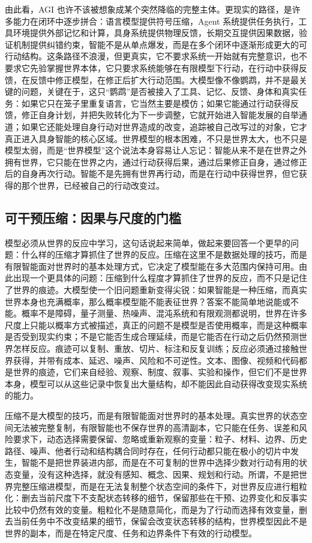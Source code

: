 由此看，AGI 也许不该被想象成某个突然降临的完整主体。更现实的路径，是许多能力在闭环中逐步拼合：语言模型提供符号压缩，Agent 系统提供任务执行，工具环境提供外部记忆和计算，具身系统提供物理反馈，长期交互提供因果数据，验证机制提供纠错约束，智能不是从单点爆发，而是在多个闭环中逐渐形成更大的可行动结构。这条路径不浪漫，但更真实，它不要求系统一开始就有完整意识，也不要求它先验掌握世界本体，它只要求系统能够在有限模型下行动，在行动中获得反馈，在反馈中修正模型，在修正后扩大行动范围。大模型像不像鹦鹉，并不是最关键的问题，关键在于，这只“鹦鹉”是否被接入了工具、记忆、反馈、身体和真实任务：如果它只在笼子里重复语言，它当然主要是模仿；如果它能通过行动获得反馈，修正自身计划，并把失败转化为下一步调整，它就开始进入智能发展的自举通道；如果它还能处理自身行动对世界造成的改变，追踪被自己改写过的对象，它才真正进入具身智能的核心区域。世界模型的根本困难，不只是世界太大，也不只是模型太弱，而是“世界模型”这个说法本身容易让人忘记：智能从来不是在世界之外拥有世界，它只能在世界之内，通过行动获得后果，通过后果修正自身，通过修正后的自身再次行动。智能不是先拥有世界再行动，而是在行动中获得世界，但它获得的那个世界，已经被自己的行动改变过。

\subsection{可干预压缩：因果与尺度的门槛}

模型必须从世界的反应中学习，这句话说起来简单，做起来要回答一个更早的问题：什么样的压缩才算抓住了世界的反应。压缩在这里不是数据处理的技巧，而是有限智能面对世界时的基本处理方式，它决定了模型能在多大范围内保持可用。由此出现一个更具体的问题：压缩到什么程度才算抓住了世界的反应，而不只是记住了世界的痕迹。大模型使一个旧问题重新变得尖锐：如果智能是一种压缩，而真实世界本身也充满概率，那么概率模型能不能表征世界？答案不能简单地说能或不能。概率不是障碍，量子测量、热噪声、混沌系统和有限观测都说明，世界在许多尺度上只能以概率方式被描述，真正的问题不是模型是否使用概率，而是这种概率是否受到现实约束；不是它能否生成合理延续，而是它能否在行动之后仍然预测世界怎样反应。痕迹可以复制、重放、切片、标注和反复训练；反应必须通过接触世界获得，并带有成本、延迟、噪声、风险和不可逆性。文本、图像、视频和代码都是世界的痕迹，它们来自经验、观察、制度、叙事、实验和操作，但它们不是世界本身，模型可以从这些记录中恢复出大量结构，却不能因此自动获得改变现实系统的能力。


压缩不是大模型的技巧，而是有限智能面对世界时的基本处理。真实世界的状态空间无法被完整复制，有限智能也不保存世界的高清副本，它只能在任务、误差和风险要求下，动态选择需要保留、忽略或重新观察的变量：粒子、材料、边界、历史路径、噪声、他者行动和结构耦合同时存在，任何行动都只能在极小的切片中发生，智能不是把世界装进内部，而是在不可复制的世界中选择少数对行动有用的状态变量，没有这种选择，就没有感知、概念、因果、规划和行动。所谓，不是把世界完整压缩进模型，而是在无法复制整个状态空间的条件下，对世界反应进行粗粒化：删去当前尺度下不支配状态转移的细节，保留那些在干预、边界变化和反事实比较中仍然有效的变量。粗粒化不是随意简化，而是为了行动而选择有效变量，删去当前任务中不改变结果的细节，保留会改变状态转移的结构，世界模型因此不是世界的副本，而是在特定尺度、任务和边界条件下有效的行动模型。

